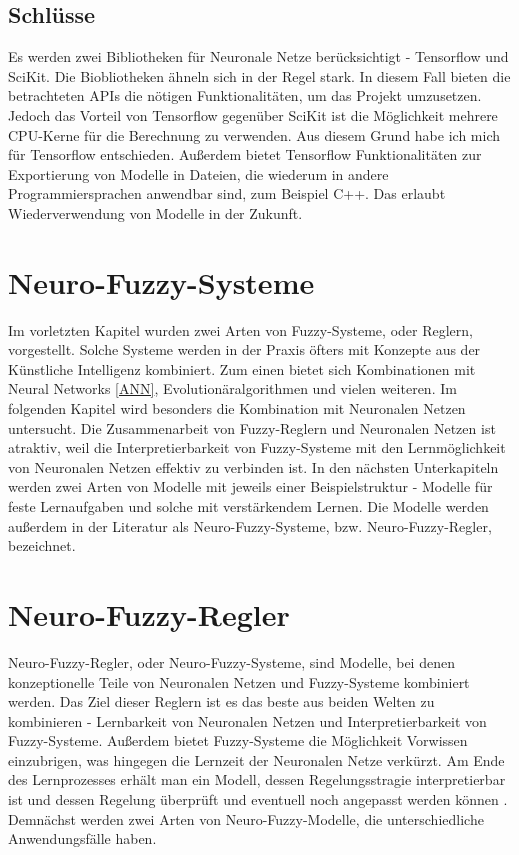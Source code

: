 
\subsection{Schlüsse}

Es werden zwei Bibliotheken für Neuronale Netze berücksichtigt - Tensorflow und SciKit. Die Biobliotheken ähneln sich in der Regel stark. In diesem Fall bieten die betrachteten APIs die nötigen Funktionalitäten, um das Projekt umzusetzen. Jedoch das Vorteil von Tensorflow gegenüber SciKit ist die Möglichkeit mehrere CPU-Kerne für die Berechnung zu verwenden. Aus diesem Grund habe ich mich für Tensorflow entschieden. Außerdem bietet Tensorflow Funktionalitäten zur Exportierung von Modelle in Dateien, die wiederum in andere Programmiersprachen anwendbar sind, zum Beispiel C++. Das erlaubt Wiederverwendung von Modelle in der Zukunft.








\section{Neuro-Fuzzy-Systeme}

Im vorletzten Kapitel wurden zwei Arten von Fuzzy-Systeme, oder Reglern, vorgestellt. Solche Systeme werden in der Praxis öfters mit Konzepte aus der Künstliche Intelligenz kombiniert. Zum einen bietet sich Kombinationen mit Neural Networks \ref{ANN}, Evolutionäralgorithmen und vielen weiteren. Im folgenden Kapitel wird besonders die Kombination mit Neuronalen Netzen untersucht. Die Zusammenarbeit von Fuzzy-Reglern und Neuronalen Netzen ist atraktiv, weil die Interpretierbarkeit von Fuzzy-Systeme mit den Lernmöglichkeit von Neuronalen Netzen effektiv zu verbinden ist. In den nächsten Unterkapiteln werden zwei Arten von Modelle mit jeweils einer Beispielstruktur - Modelle für feste Lernaufgaben und solche mit verstärkendem Lernen. Die Modelle werden außerdem in der Literatur als Neuro-Fuzzy-Systeme, bzw. Neuro-Fuzzy-Regler, bezeichnet. \cite{CIKruse:15}
\section{Neuro-Fuzzy-Regler}

Neuro-Fuzzy-Regler, oder Neuro-Fuzzy-Systeme, sind Modelle, bei denen konzeptionelle Teile von Neuronalen Netzen und Fuzzy-Systeme kombiniert werden. Das Ziel dieser Reglern ist es das beste aus beiden Welten zu kombinieren - Lernbarkeit von Neuronalen Netzen und Interpretierbarkeit von Fuzzy-Systeme. Außerdem bietet Fuzzy-Systeme die Möglichkeit Vorwissen einzubrigen, was hingegen die Lernzeit der Neuronalen Netze verkürzt. Am Ende des Lernprozesses erhält man ein Modell, dessen Regelungsstragie interpretierbar ist und dessen Regelung überprüft und eventuell noch angepasst werden können \cite{CIKruse:15}. Demnächst werden zwei Arten von Neuro-Fuzzy-Modelle, die unterschiedliche Anwendungsfälle haben.

